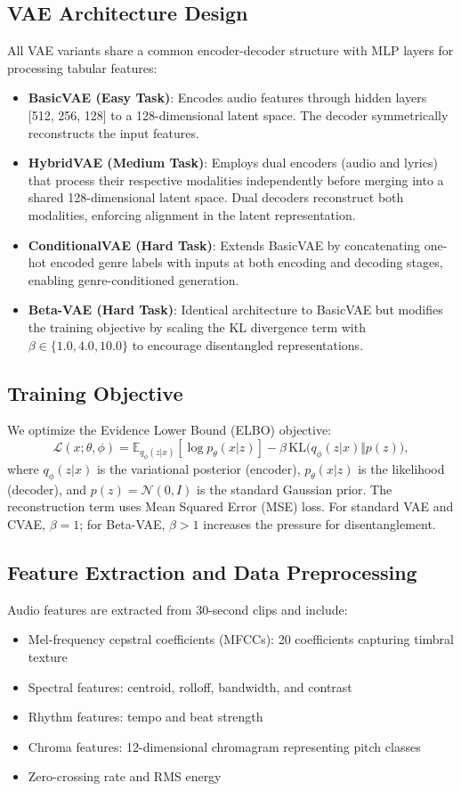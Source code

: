 \documentclass[11pt]{article}
\begin{document}
\subsection{VAE Architecture Design}
All VAE variants share a common encoder-decoder structure with MLP layers for processing tabular features:
\begin{itemize}
\item \textbf{BasicVAE (Easy Task)}: Encodes audio features through hidden layers [512, 256, 128] to a 128-dimensional latent space. The decoder symmetrically reconstructs the input features.
\item \textbf{HybridVAE (Medium Task)}: Employs dual encoders (audio and lyrics) that process their respective modalities independently before merging into a shared 128-dimensional latent space. Dual decoders reconstruct both modalities, enforcing alignment in the latent representation.
\item \textbf{ConditionalVAE (Hard Task)}: Extends BasicVAE by concatenating one-hot encoded genre labels with inputs at both encoding and decoding stages, enabling genre-conditioned generation.
\item \textbf{Beta-VAE (Hard Task)}: Identical architecture to BasicVAE but modifies the training objective by scaling the KL divergence term with $\beta \in \{1.0, 4.0, 10.0\}$ to encourage disentangled representations.
\end{itemize}

\subsection{Training Objective}
We optimize the Evidence Lower Bound (ELBO) objective:
\begin{equation}
\mathcal{L}(x;\theta,\phi)=\mathbb{E}_{q_\phi(z|x)}[\log p_\theta(x|z)]-\beta\,\mathrm{KL}\big(q_\phi(z|x)\Vert p(z)\big),
\end{equation}
where $q_\phi(z|x)$ is the variational posterior (encoder), $p_\theta(x|z)$ is the likelihood (decoder), and $p(z)=\mathcal{N}(0,I)$ is the standard Gaussian prior. The reconstruction term uses Mean Squared Error (MSE) loss. For standard VAE and CVAE, $\beta=1$; for Beta-VAE, $\beta>1$ increases the pressure for disentanglement.

\subsection{Feature Extraction and Data Preprocessing}
Audio features are extracted from 30-second clips and include:
\begin{itemize}
\item Mel-frequency cepstral coefficients (MFCCs): 20 coefficients capturing timbral texture
\item Spectral features: centroid, rolloff, bandwidth, and contrast
\item Rhythm features: tempo and beat strength
\item Chroma features: 12-dimensional chromagram representing pitch classes
\item Zero-crossing rate and RMS energy
\end{itemize}
\end{document}
